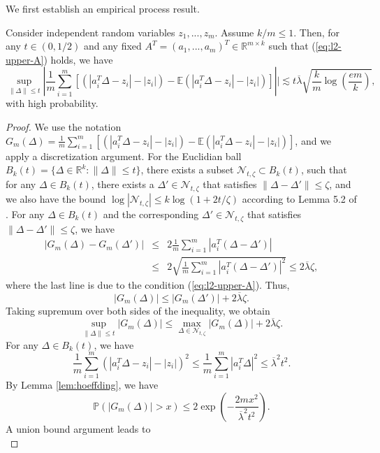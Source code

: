 We first establish an empirical process result.
\begin{lemma}\label{lem:EP}
Consider independent random variables $z_1,...,z_m$. Assume $k/m\leq 1$. Then, for any $t\in (0,1/2)$ and any fixed $A^T=(a_1,...,a_m)^T\in\mathbb{R}^{m\times k}$ such that (\ref{eq:l2-upper-A}) holds, we have
$$\sup_{\|\Delta\|\leq t}\left|\frac{1}{m}\sum_{i=1}^m[(|a_i^T\Delta-z_i|-|z_i|)-\mathbb{E}(|a_i^T\Delta-z_i|-|z_i|)]\right|| \lesssim t\overline{\lambda}\sqrt{\frac{k}{m}\log\left(\frac{em}{k}\right)},$$
with high probability.
\end{lemma}
\begin{proof}
We use the notation $G_m(\Delta)=\frac{1}{m}\sum_{i=1}^m[(|a_i^T\Delta-z_i|-|z_i|)-\mathbb{E}(|a_i^T\Delta-z_i|-|z_i|)]$, and we apply a discretization argument. For the Euclidian ball $B_k(t)=\{\Delta\in\mathbb{R}^k:\|\Delta\|\leq t\}$, there exists a subset $\mathcal{N}_{t,\zeta}\subset B_k(t)$, such that for any $\Delta\in B_k(t)$, there exists a $\Delta'\in\mathcal{N}_{t,\zeta}$ that satisfies $\|\Delta-\Delta'\|\leq \zeta$, and we also have the bound $\log|\mathcal{N}_{t,\zeta}|\leq k\log(1+2t/\zeta)$ according to Lemma 5.2 of \cite{vershynin2010introduction}. For any $\Delta\in B_k(t)$ and the corresponding $\Delta'\in\mathcal{N}_{t,\zeta}$ that satisfies $\|\Delta-\Delta'\|\leq \zeta$, we have
\begin{eqnarray*}
|G_m(\Delta)-G_m(\Delta')| &\leq& 2\frac{1}{m}\sum_{i=1}^m|a_i^T(\Delta-\Delta')| \\
&\leq& 2\sqrt{\frac{1}{m}\sum_{i=1}^m|a_i^T(\Delta-\Delta')|^2} \leq 2\overline{\lambda}\zeta,
\end{eqnarray*}
where the last line is due to the condition (\ref{eq:l2-upper-A}). Thus,
$$\left|G_m(\Delta)\right| \leq \left|G_m(\Delta')\right| + 2\overline{\lambda}\zeta.$$
Taking supremum over both sides of the inequality, we obtain
\begin{equation}
\sup_{\|\Delta\|\leq t}|G_m(\Delta)| \leq \max_{\Delta\in\mathcal{N}_{t,\zeta}}\left|G_m(\Delta)\right| + 2\overline{\lambda}\zeta. \label{eq:disc-not-good}
\end{equation}
For any $\Delta\in B_k(t)$, we have
$$\frac{1}{m}\sum_{i=1}^m\left(|a_i^T\Delta-z_i|-|z_i|\right)^2\leq \frac{1}{m}\sum_{i=1}^m|a_i^T\Delta|^2\leq \overline{\lambda}^2t^2.$$
By Lemma \ref{lem:hoeffding}, we have
$$\mathbb{P}\left(\left|G_m(\Delta)\right| > x\right) \leq 2\exp\left(-\frac{2mx^2}{\overline{\lambda}^2t^2}\right).$$
A union bound argument leads to
\begin{equation}

\end{equation}
\end{proof}
